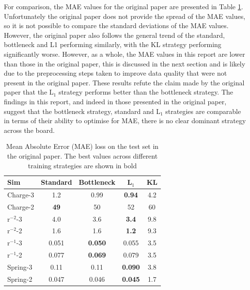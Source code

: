 \documentclass[11pt]{article}
\begin{document}
For comparison, the MAE values for the original paper are presented in Table \ref{tab:mae_table_original}. Unfortunately the original paper does not provide the spread of the MAE values, so it is not possible to compare the standard deviations of the MAE values. However, the original paper also follows the general trend of the standard, bottleneck and L1 performing similarly, with the KL strategy performing significantly worse. However, as a whole, the MAE values in this report are lower than those in the original paper, this is discussed in the next section and is likely due to the preprocessing steps taken to improve data quality that were not present in the original paper. These results refute the claim made by the original paper that the L$_1$ strategy performs better than the bottleneck strategy. The findings in this report, and indeed in those presented in the original paper, suggest that the bottleneck strategy, standard and L$_1$ strategies are comparable in terms of their ability to optimise for MAE, there is no clear dominant strategy across the board.

\begin{table}[H]
    \centering
    \begin{tabular}{lcccc}
    \hline
    Sim & Standard & Bottleneck & L$_1$ & KL \\
    \hline
    Charge-3 & 1.2  & 0.99  & \textbf{0.94}  & 4.2  \\
    Charge-2 & \textbf{49}  & 50  & 52  & 60  \\
    r$^{-2}$-3 & 4.0 & 3.6  & \textbf{3.4} & 9.8  \\
    r$^{-2}$-2 & 1.6  & 1.6  & \textbf{1.2}  & 9.3  \\
    r$^{-1}$-3 & 0.051 & \textbf{0.050}  & 0.055 & 3.5   \\
    r$^{-1}$-2 & 0.077  & \textbf{0.069}  & 0.079  & 3.5   \\
    Spring-3 & 0.11  & 0.11  & \textbf{0.090}  & 3.8  \\
    Spring-2 & 0.047  & 0.046  & \textbf{0.045}  & 1.7  \\
    \hline
    \end{tabular}
    \caption{Mean Absolute Error (MAE) loss on the test set in the original paper. The best values across different training strategies are shown in bold}
    \label{tab:mae_table_original}
    \end{table}
\end{document}
